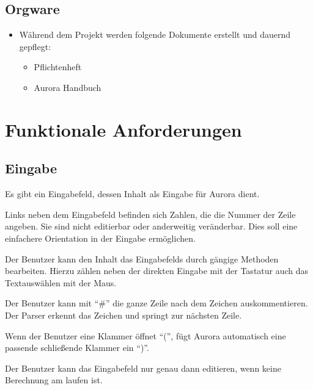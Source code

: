 \documentclass[parskip=full,11pt,twoside]{scrartcl}
\begin{document}
\subsection{Orgware}
	\begin{itemize}
		\item Während dem Projekt werden folgende Dokumente erstellt und dauernd gepflegt:
			\begin{itemize}
				\item Pflichtenheft
				\item Aurora Handbuch
			\end{itemize}
	\end{itemize}
\newpage


\section{Funktionale Anforderungen}

\subsection{Eingabe}

Es gibt ein Eingabefeld, dessen Inhalt als Eingabe für Aurora dient.

Links neben dem Eingabefeld befinden sich Zahlen, die die Nummer der Zeile angeben. Sie sind nicht editierbar oder anderweitig veränderbar. Dies soll eine einfachere Orientation in der Eingabe ermöglichen.

Der Benutzer kann den Inhalt das Eingabefelds durch gängige Methoden bearbeiten. Hierzu zählen neben der direkten Eingabe mit der Tastatur auch das Textauswählen mit der Maus.

Der Benutzer kann mit \enquote{\#} die ganze Zeile nach dem Zeichen auskommentieren. Der Parser erkennt das Zeichen und springt zur nächsten Zeile.

Wenn der Benutzer eine Klammer öffnet \enquote{(}, fügt Aurora automatisch eine passende schließende Klammer ein \enquote{)}.

Der Benutzer kann das Eingabefeld nur genau dann editieren, wenn keine Berechnung am laufen ist.
\end{document}
